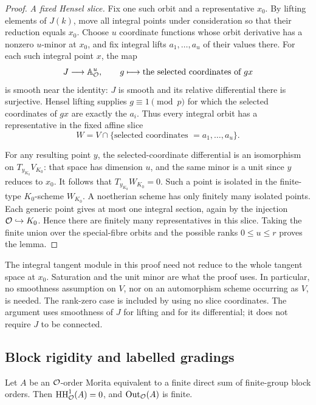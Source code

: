 \begin{proof}
\emph{A fixed Hensel slice.}
Fix one such orbit and a representative $x_0$.  By lifting elements
of $J(k)$, move all integral points under consideration so that
their reduction equals $x_0$.  Choose $u$ coordinate functions
whose orbit derivative has a nonzero $u$-minor at $x_0$, and fix
integral lifts $a_1,\ldots,a_u$ of their values there.  For each
such integral point $x$, the map
\[
 J\longrightarrow\mathbb A^u_{\mathcal O},\qquad
 g\longmapsto\text{the selected coordinates of }g x
\]
is smooth near the identity: $J$ is smooth and its relative
differential there is surjective.  Hensel lifting supplies
$g\equiv1\pmod p$ for which the selected coordinates of $gx$
are exactly the $a_i$.  Thus every integral orbit has a
representative in the fixed affine slice
\[
 W=V\cap\{\text{selected coordinates }=a_1,\ldots,a_u\}.
\]

For any resulting point $y$, the selected-coordinate differential
is an isomorphism on $T_{y_{K_0}}V_{K_0}$: that space has dimension
$u$, and the same minor is a unit since $y$ reduces to $x_0$.
It follows that $T_{y_{K_0}}W_{K_0}=0$.  Such a point is isolated
in the finite-type $K_0$-scheme $W_{K_0}$.  A noetherian scheme
has only finitely many isolated points.  Each generic point gives
at most one integral section, again by the injection
$\mathcal O\hookrightarrow K_0$.  Hence there are finitely many
representatives in this slice.  Taking the finite union over the
special-fibre orbits and the possible ranks $0\leq u\leq r$
proves the lemma.
\end{proof}

The integral tangent module in this proof need not reduce to the
whole tangent space at $x_0$.  Saturation and the unit minor are
what the proof uses.  In particular, no smoothness assumption on
$V$, nor on an automorphism scheme occurring as $V$, is needed.
The rank-zero case is included by using no slice coordinates.  The
argument uses smoothness of $J$ for lifting and for its differential;
it does not require $J$ to be connected.

\subsection{Block rigidity and labelled gradings}

\begin{lemma}
\label{lem:HH}
Let $A$ be an $\mathcal O$-order Morita equivalent to a finite direct sum
of finite-group block orders.  Then $\operatorname{HH}^1_{\mathcal O}(A)=0$, and
$\operatorname{Out}_{\mathcal O}(A)$ is finite.
\end{lemma}

